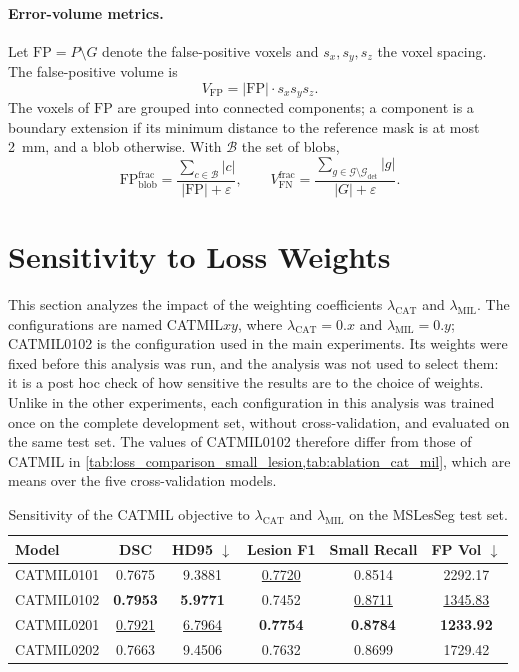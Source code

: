 \paragraph{Error-volume metrics.}
Let $\mathrm{FP} = P \setminus G$ denote the false-positive voxels and
$s_x, s_y, s_z$ the voxel spacing. The false-positive volume is
\begin{equation}
V_{\mathrm{FP}} = |\mathrm{FP}| \cdot s_x s_y s_z.
\end{equation}
The voxels of $\mathrm{FP}$ are grouped into connected components; a
component is a boundary extension if its minimum distance to the reference
mask is at most 2~mm, and a blob otherwise. With $\mathcal{B}$ the set of
blobs,
\begin{equation}
\mathrm{FP}_{\mathrm{blob}}^{\mathrm{frac}}
= \frac{\sum_{c \in \mathcal{B}} |c|}{|\mathrm{FP}| + \varepsilon},
\qquad
V_{\mathrm{FN}}^{\mathrm{frac}}
= \frac{\sum_{g \in \mathcal{G} \setminus \mathcal{G}_{\mathrm{det}}} |g|}
{|G| + \varepsilon}.
\end{equation}

\section{Sensitivity to Loss Weights}
\label{appendix:catmil-loss-weights}

This section analyzes the impact of the weighting coefficients
$\lambda_{\text{CAT}}$ and $\lambda_{\text{MIL}}$. The configurations are
named CATMIL$xy$, where $\lambda_{\text{CAT}}=0.x$ and
$\lambda_{\text{MIL}}=0.y$; CATMIL0102 is the configuration used in the
main experiments. Its weights were fixed before this analysis was run, and
the analysis was not used to select them: it is a post hoc check of how
sensitive the results are to the choice of weights. Unlike in the other
experiments, each configuration in this analysis was trained once on the
complete development set, without cross-validation, and evaluated on the
same test set. The values of CATMIL0102 therefore differ from those of
CATMIL in \cref{tab:loss_comparison_small_lesion,tab:ablation_cat_mil},
which are means over the five cross-validation models.

\begin{table}[H]
\centering
\caption{Sensitivity of the CATMIL objective to $\lambda_{\text{CAT}}$ and
$\lambda_{\text{MIL}}$ on the MSLesSeg test set.}
\label{tab:ablation_lambda}
\begin{tabular}{lccccc}
\toprule
Model & DSC & HD95 $\downarrow$ & Lesion F1 & Small Recall & FP Vol $\downarrow$ \\
\midrule
CATMIL0101 & 0.7675 & 9.3881 & \underline{0.7720} & 0.8514 & 2292.17 \\
CATMIL0102 & \textbf{0.7953} & \textbf{5.9771} & 0.7452 & \underline{0.8711} & \underline{1345.83} \\
CATMIL0201 & \underline{0.7921} & \underline{6.7964} & \textbf{0.7754} & \textbf{0.8784} & \textbf{1233.92} \\
CATMIL0202 & 0.7663 & 9.4506 & 0.7632 & 0.8699 & 1729.42 \\
\bottomrule
\end{tabular}
\end{table}

